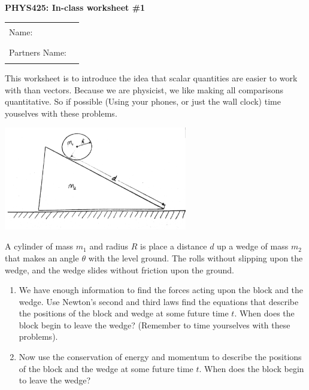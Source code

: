 \documentclass[10pt]{article}
\begin{document}
\thispagestyle{empty}
\makebox{\hspace{1cm}}
\vspace{-0.5in}
\begin{center}

{\Large \bf PHYS425: In-class worksheet \#1} \\
\end{center}


\vspace{0.5cm}
\begin{tabular}{ll}
Name: & \quad \rule{5in}{0.4pt} \\[0.3cm]
Partners Name: &  \quad \rule{5in}{0.4pt} 
\end{tabular}
\vspace{0.5cm}

\vspace{0.5cm}
This worksheet is to introduce the idea that scalar quantities are easier to work with than vectors. Because we are physicist, we like making all comparisons quantitative. So if possible (Using your phones, or just the wall clock) time youselves with these problems.

\begin{center}
\includegraphics[width=0.6\textwidth]{fig.pdf}
\end{center}

A cylinder of mass $m_1$ and radius $R$ is place a distance $d$ up a wedge of mass $m_2$ that makes an angle $\theta$ with the level ground. The rolls without slipping upon the wedge, and the wedge slides without friction upon the ground.

\begin{enumerate}
\item We have enough information to find the forces acting upon the block and the wedge. Use Newton's second and third laws find the equations that describe the positions of the block and wedge at some future time $t$. When does the block begin to leave the wedge? (Remember to time yourselves with these problems).

\newpage

\item Now use the conservation of energy and momentum to describe the positions of the block and the wedge at some future time $t$. When does the block begin to leave the wedge?

\end{enumerate}
\end{document}
